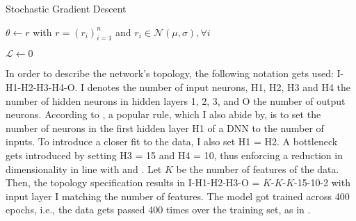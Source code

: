 \begin{algorithm}[H]
    \caption{ Stochastic Gradient Descent \cite{dixon2015annMarketPrediction} }




    $ \theta \leftarrow r $ with $ r = (r_{i})_{i=1}^{n}  $ and $ r_{i} \in \mathscr{N}( \mu, \sigma ), \forall i $


    $ \mathscr{L} \leftarrow 0 $



    \label{alg:stochastic_gradient_descent}
\end{algorithm}


In order to describe the network's topology, the following notation gets used: I-H1-H2-H3-H4-O.
I denotes the number of input neurons, H1, H2, H3 and H4 the number of hidden neurons in hidden layers 1, 2, 3, and O the number of output
neurons. According to \cite{krauss2016arbitrageSandP}, a popular rule,  which I also abide by, is to set the number of neurons in the first hidden layer H1 of a DNN
to the number of inputs.
To introduce a closer fit to the data, I also set H1 = H2.
A bottleneck gets introduced by setting H3 = 15 and H4 = 10, thus enforcing a reduction in dimensionality in line with \cite{takeuchi2013momentumTrading} and 
\cite{dixon2015annMarketPrediction}.
Let $K$ be the number of features of the data. Then, the topology specification results in 
I-H1-H2-H3-O = $K$-$K$-$K$-15-10-2 with input layer I matching the number of features.
The model got trained across 400 epochs, i.e., the data gets passed 400 times over the training set, as in \cite{huck2009pairSelection}.

